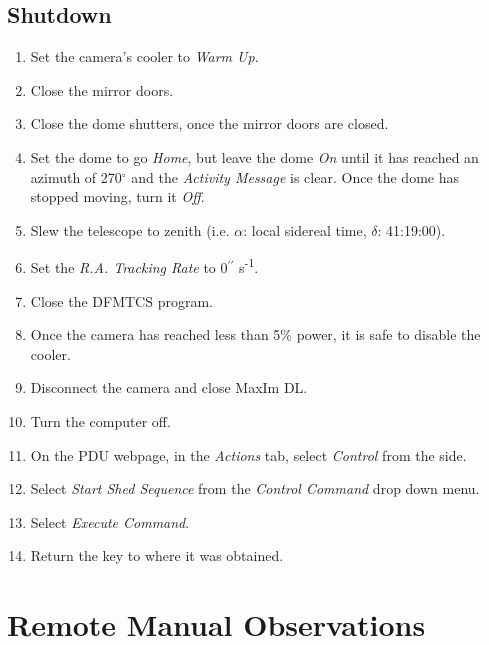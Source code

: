 \documentclass[letterpaper,12pt]{article}
\begin{document}
	\subsection{Shutdown}
	\begin{enumerate}
		\item Set the camera's  cooler to \textit{Warm Up}.
		\item Close the mirror doors.
		\item Close the dome shutters, once the mirror doors are closed.
		\item Set the dome to go \textit{Home}, but leave the dome \textit{On} until it has reached an azimuth of 270$^\circ$ and the \textit{Activity Message} is clear. Once the dome has stopped moving, turn it \textit{Off}.
		\item Slew the telescope to zenith (i.e. $\alpha$: local sidereal time, $\delta$: 41:19:00).
		\item Set the \textit{R.A. Tracking Rate} to 0$^{\prime\prime}$ s\textsuperscript{-1}.
		\item Close the DFMTCS program.
		\item Once the camera has reached less than 5\% power, it is safe to disable the cooler.
		\item Disconnect the camera and close MaxIm DL.
		\item Turn the computer off.
		\item On the PDU webpage, in the \textit{Actions} tab, select \textit{Control} from the side.
		\item Select \textit{Start Shed Sequence} from the \textit{Control Command} drop down menu.
		\item Select \textit{Execute Command}.
		\item Return the key to where it was obtained.
	\end{enumerate}
\newpage
\section{Remote Manual Observations}\label{sec:remote}
\end{document}
